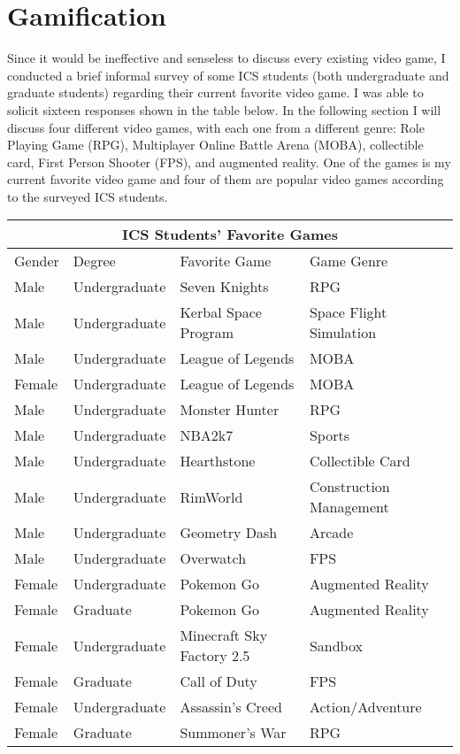 \section{Gamification}
Since it would be ineffective and senseless to discuss every existing video game, I conducted a brief informal survey of some ICS students (both undergraduate and graduate students) regarding their current favorite video game. I was able to solicit sixteen responses shown in the table below. In the following section I will discuss four different video games, with each one from a different genre: Role Playing Game (RPG), Multiplayer Online Battle Arena (MOBA), collectible card, First Person Shooter (FPS), and augmented reality. One of the games is my current favorite video game and four of them are popular video games according to the surveyed ICS students. 
\\
\begin{tabular}{ |p{2cm}|p{3cm}|p{5cm}|p{5cm}|}
 \hline
 \multicolumn{4}{|c|}{ICS Students' Favorite Games} \\
 \hline
 Gender & Degree & Favorite Game & Game Genre\\
 \hline
 Male   & Undergraduate    & Seven Knights & RPG\\
 Male   & Undergraduate    & Kerbal Space Program & Space Flight Simulation\\
 Male   & Undergraduate    & League of Legends & MOBA\\
 Female   & Undergraduate    & League of Legends & MOBA\\
 Male   & Undergraduate    & Monster Hunter & RPG\\
 Male   & Undergraduate    & NBA2k7 & Sports\\
 Male   & Undergraduate    & Hearthstone & Collectible Card\\
 Male   & Undergraduate    & RimWorld & Construction Management\\
 Male   & Undergraduate    & Geometry Dash & Arcade\\
 Male   & Undergraduate    & Overwatch & FPS\\
 Female   & Undergraduate    & Pokemon Go & Augmented Reality\\
 Female   & Graduate    & Pokemon Go & Augmented Reality\\
 Female   & Undergraduate    & Minecraft Sky Factory 2.5 & Sandbox\\
 Female   & Graduate    & Call of Duty & FPS\\
 Female   & Undergraduate    & Assassin's Creed & Action/Adventure\\
 Female   & Graduate    & Summoner's War & RPG\\
 \hline
\end{tabular}

